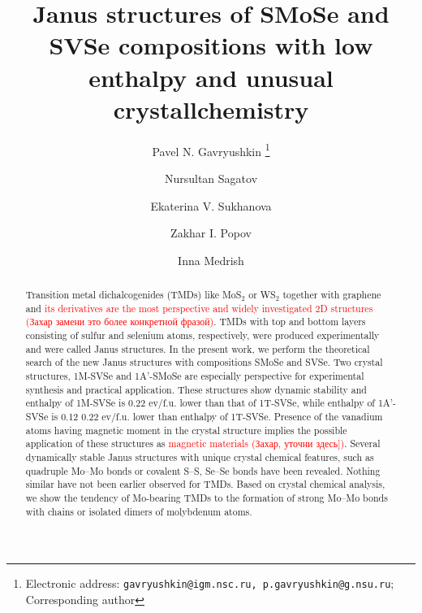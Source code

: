 \documentclass[a4paperm]{article}
\begin{document}

\title{Janus structures of SMoSe and SVSe compositions with low enthalpy and unusual crystallchemistry}


\author[1,2,3]{Pavel N. Gavryushkin
   \thanks{Electronic address: \texttt{gavryushkin@igm.nsc.ru, p.gavryushkin@g.nsu.ru}; Corresponding author}}     
\author[2]{Nursultan Sagatov}
\author[1]{Ekaterina V. Sukhanova}
\author[1]{Zakhar I. Popov}
\author[4]{Inna Medrish}



\date{}
\maketitle


\begin{abstract}
Transition metal dichalcogenides (TMDs) like MoS$_2$ or WS$_2$ together with graphene and \textcolor{red}{its derivatives are the most perspective and widely investigated 2D structures (Захар замени это более конкретной фразой)}.
TMDs with top and bottom layers consisting of sulfur and selenium atoms, respectively, were produced experimentally and were called Janus structures.
In the present work, we perform the theoretical search of the new Janus structures with compositions SMoSe and SVSe.
Two crystal structures, 1M-SVSe and 1A'-SMoSe are especially perspective for experimental synthesis and practical application.
These structures show dynamic stability and enthalpy of 1M-SVSe is 0.22 ev/f.u. lower than that of 1T-SVSe, while enthalpy of 1A'-SVSe is 0.12 0.22 ev/f.u. lower than enthalpy of 1T-SVSe.
Presence of the vanadium atoms having magnetic moment in the crystal structure implies the possible application of these structures as \textcolor{red}{magnetic materials (Захар, уточни здесь])}.
Several dynamically stable Janus structures with unique crystal chemical features, such as quadruple Mo--Mo bonds or covalent S--S, Se--Se bonds have been revealed.
Nothing similar have not been earlier observed for TMDs.
Based on crystal chemical analysis, we show the tendency of Mo-bearing TMDs to the formation of strong Mo--Mo bonds with chains or isolated  dimers of molybdenum atoms.

\end{abstract}
\end{document}
